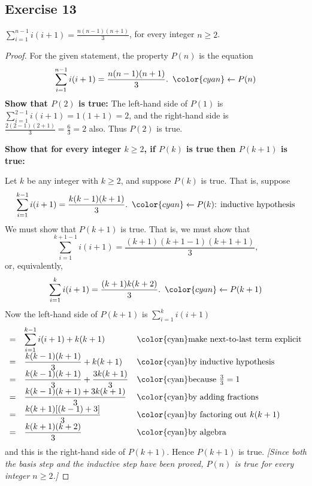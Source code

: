 \documentclass[14pt]{extarticle}
\newcommand{\dps}{\displaystyle}
\newcommand{\from}{\leftarrow}
\newcommand{\cy}{\color{cyan}}
\begin{document}
\subsection{Exercise 13}
$\dps \sum_{i=1}^{n-1}i(i+1) = \frac{n(n-1)(n+1)}{3}$, for every integer $n \geq 2$.

\begin{proof}
    For the given statement, the property $P(n)$ is the equation
    \[
        \dps \sum_{i=1}^{n-1}i(i+1) = \frac{n(n-1)(n+1)}{3}. \,\,\, {\cy \from P(n)}
    \]
    {\bf Show that $P(2)$ is true:} The left-hand side of $P(1)$ is $\dps \sum_{i=1}^{2-1}i(i+1) = 1(1+1) = 2$, and the right-hand side is $\dps \frac{2(2-1)(2+1)}{3} = \frac{6}{3} = 2$ also. Thus $P(2)$ is true.

        {\bf Show that for every integer $k \geq 2$, if $P(k)$ is true then $P(k + 1)$ is true:}

    Let $k$ be any integer with $k \geq 2$, and suppose $P(k)$ is true. That is, suppose
    \[
        \dps \sum_{i=1}^{k-1}i(i+1) = \frac{k(k-1)(k+1)}{3}. \,\,\, {\cy \from P(k) \text{: inductive hypothesis}}
    \]
    We must show that $P(k + 1)$ is true. That is, we must show that
    \[
        \dps \sum_{i=1}^{k+1-1}i(i+1) = \frac{(k+1)(k+1-1)(k+1+1)}{3},
    \]
    or, equivalently,
    \[
        \dps \sum_{i=1}^{k}i(i+1) = \frac{(k+1)k(k+2)}{3}. \,\,\,{\cy \from P(k+1)}
    \]
    Now the left-hand side of $P(k + 1)$ is $\dps \sum_{i=1}^{k}i(i+1)$
    \[
        \begin{array}{lll}
            = & \dps \sum_{i=1}^{k-1}i(i+1) + k(k+1)           & \text{\cy make next-to-last term explicit} \\
            = & \dps \frac{k(k-1)(k+1)}{3} + k(k+1)            & \text{\cy by inductive hypothesis}         \\
            = & \dps \frac{k(k-1)(k+1)}{3} + \frac{3k(k+1)}{3} & \text{\cy because $\frac{3}{3} = 1$}       \\
            = & \dps \frac{k(k-1)(k+1) + 3k(k+1)}{3}           & \text{\cy by adding fractions}             \\
            = & \dps \frac{k(k+1)[(k-1) + 3]}{3}               & \text{\cy by factoring out $k(k+1)$}       \\
            = & \dps \frac{k(k+1)(k+2)}{3}                     & \text{\cy by algebra}
        \end{array}
    \]
    and this is the right-hand side of $P(k + 1)$. Hence $P(k + 1)$ is true. {\it [Since both the basis step and the inductive step have been proved, $P(n)$ is true for every integer $n \geq 2$.]}
\end{proof}
\end{document}
